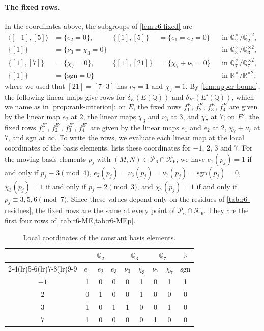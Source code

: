 \documentclass[12pt,oneside,openany]{book}
\theoremstyle{definition}
\theoremstyle{plain}
\numberwithin{equation}{chapter}
\theoremstyle{plain}
\theoremstyle{definition}
\theoremstyle{remark}
\newcommand{\Q}{\mathbb Q}
\newcommand{\R}{\mathbb R}
\newcommand{\sq}[1]{[#1]}
\newcommand{\sqgp}[1]{#1^{\times}/#1^{\times2}}
\newcommand{\cP}{\mathcal P}
\newcommand{\cK}{\mathcal K}
\begin{document}
\paragraph{The fixed rows.} In the coordinates above, the subgroups of \cref{lem:r6-fixed} are
\[
\begin{aligned}
\langle\sq{-1},\sq5\rangle&=\{e_2=0\}, & \{\sq1,\sq5\}&=\{e_1=e_2=0\} &&\text{in } \sqgp{\Q_2},\\
\{\sq1\}&=\{\nu_3=\chi_3=0\} &&&&\text{in } \sqgp{\Q_3},\\
\{\sq1,\sq7\}&=\{\chi_7=0\}, & \{\sq1,\sq{21}\}&=\{\chi_7+\nu_7=0\} &&\text{in } \sqgp{\Q_7},\\
\{\sq1\}&=\{\mathrm{sgn}=0\} &&&&\text{in } \sqgp{\R},
\end{aligned}
\]
where we used that $\sq{21}=\sq{7\cdot3}$ has $\nu_7=1$ and $\chi_7=1$. By \cref{lem:upper-bound}, the following linear maps give rows for $\delta_E(E(\Q))$ and $\delta_{E'}(E'(\Q))$, which we name as in \cref{prop:rank-criterion}: on $E$, the fixed rows $f^E_1$, $f^E_2$, $f^E_3$, $f^E_4$ are given by the linear map $e_2$ at $2$, the linear maps $\chi_3$ and $\nu_3$ at $3$, and $\chi_7$ at $7$; on $E'$, the fixed rows $f^{E'}_1$, $f^{E'}_2$, $f^{E'}_3$, $f^{E'}_4$ are given by the linear maps $e_1$ and $e_2$ at $2$, $\chi_7+\nu_7$ at $7$, and $\mathrm{sgn}$ at $\infty$. To write the rows, we evaluate each linear map at the local coordinates of the basis elements.  lists these coordinates for $-1$, $2$, $3$ and $7$. For the moving basis elements $p_j$ with $(M,N)\in\cP_6\cap\cK_6$, we have $e_1(p_j)=1$ if and only if $p_j\equiv3\pmod 4$, $e_2(p_j)=\nu_3(p_j)=\nu_7(p_j)=\mathrm{sgn}(p_j)=0$, $\chi_3(p_j)=1$ if and only if $p_j\equiv2\pmod3$, and $\chi_7(p_j)=1$ if and only if $p_j\equiv3,5,6\pmod7$. Since these values depend only on the residues of \cref{tab:r6-residues}, the fixed rows are the same at every point of $\cP_6\cap\cK_6$. They are the first four rows of \cref{tab:r6-ME,tab:r6-MEp}.

\begin{table}[htbp]
\centering
\caption{Local coordinates of the constant basis elements.}
\label{tab:r6-coords}
\begin{tabular}{ccccccccc}
\toprule
 & \multicolumn{3}{c}{$\Q_2$} & \multicolumn{2}{c}{$\Q_3$} & \multicolumn{2}{c}{$\Q_7$} & $\R$\\
\cmidrule(lr){2-4}\cmidrule(lr){5-6}\cmidrule(lr){7-8}\cmidrule(lr){9-9}
 & $e_1$ & $e_2$ & $e_3$ & $\nu_3$ & $\chi_3$ & $\nu_7$ & $\chi_7$ & $\mathrm{sgn}$\\
\midrule
$-1$ & 1 & 0 & 0 & 0 & 1 & 0 & 1 & 1\\
$2$ & 0 & 1 & 0 & 0 & 1 & 0 & 0 & 0\\
$3$ & 1 & 0 & 1 & 1 & 0 & 0 & 1 & 0\\
$7$ & 1 & 0 & 0 & 0 & 0 & 1 & 0 & 0\\
\bottomrule
\end{tabular}
\end{table}
\end{document}
